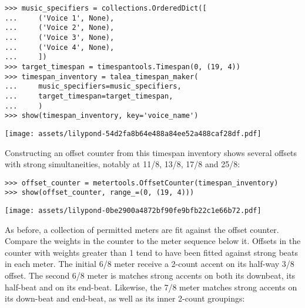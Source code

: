 \begin{singlespacing}
\vspace{-0.5\baselineskip}
\begin{lstlisting}
>>> music_specifiers = collections.OrderedDict([
...     ('Voice 1', None),
...     ('Voice 2', None),
...     ('Voice 3', None),
...     ('Voice 4', None),
...     ])
>>> target_timespan = timespantools.Timespan(0, (19, 4))
>>> timespan_inventory = talea_timespan_maker(
...     music_specifiers=music_specifiers,
...     target_timespan=target_timespan,
...     )
>>> show(timespan_inventory, key='voice_name')
\end{lstlisting}
\noindent\texttt{[image: assets/lilypond-54d2fa8b64e488a84ee52a488caf28df.pdf]}
\end{singlespacing}

\noindent Constructing an offset counter from this timespan inventory shows
several offsets with strong simultaneities, notably at 11/8, 13/8, 17/8 and
25/8:

\begin{comment}
<abjad>
offset_counter = metertools.OffsetCounter(timespan_inventory)
show(offset_counter, range_=(0, (19, 4)))
</abjad>
\end{comment}

\begin{singlespacing}
\vspace{-0.5\baselineskip}
\begin{lstlisting}
>>> offset_counter = metertools.OffsetCounter(timespan_inventory)
>>> show(offset_counter, range_=(0, (19, 4)))
\end{lstlisting}
\noindent\texttt{[image: assets/lilypond-0be2900a4872bf90fe9bfb22c1e66b72.pdf]}
\end{singlespacing}

\noindent As before, a collection of permitted meters are fit against the
offset counter. Compare the weights in the counter to the meter sequence below
it. Offsets in the counter with weights greater than 1 tend to have been fitted
against strong beats in each meter. The initial 6/8 meter receive a 2-count
accent on its half-way 3/8 offset. The second 6/8 meter is matches strong
accents on both its downbeat, its half-beat and on its end-beat. Likewise, the
7/8 meter matches strong accents on its down-beat and end-beat, as well as its
inner 2-count groupings:

\begin{comment}
<abjad>
permitted_meters = metertools.MeterInventory([
    (5, 8), (3, 4), (6, 8), (7, 8), (4, 4),
    ])
fitted_meters = metertools.Meter.fit_meters_to_expr(
    expr=offset_counter,
    meters=permitted_meters,
    maximum_run_length=1,
    )
show(offset_counter, range_=(0, (19, 4)))
show(fitted_meters, range_=(0, (19, 4)))
</abjad>
\end{comment}

